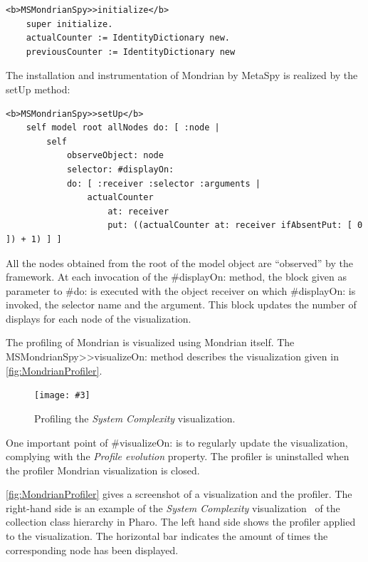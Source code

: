 \documentclass[runningheads]{llncs}
\newcommand{\project}{{\sc MetaSpy}\xspace}
\newcommand{\ct}{\lstinline[backgroundcolor=\color{white},basicstyle=\footnotesize\ttfamily]}
\newcommand{\ab}[1]{\nb{Alexandre}{blue}{#1}}
\newcommand{\lr}[1]{\nb{Lukas}{orange}{#1}}
\newcommand{\on}[1]{\nb{Oscar}{olive}{#1}}
\newcommand{\fig}[4]{
    \begin{figure}[#1]
        \centering
        \texttt{[image: \#3]}
        \caption{\label{fig:#3}#4}
    \end{figure}}
\newcommand{\co}[1]{{\sf #1}}
\begin{document}
\begin{lstlisting}
<b>MSMondrianSpy>>initialize</b>
    super initialize.
    actualCounter := IdentityDictionary new.
    previousCounter := IdentityDictionary new
\end{lstlisting}

The installation and instrumentation of Mondrian by \project is realized by the {\sf setUp} method:

\begin{lstlisting}
<b>MSMondrianSpy>>setUp</b>
    self model root allNodes do: [ :node |
        self 
            observeObject: node
            selector: #displayOn:
            do: [ :receiver :selector :arguments |
                actualCounter 
                    at: receiver
                    put: ((actualCounter at: receiver ifAbsentPut: [ 0 ]) + 1) ] ]
\end{lstlisting}

All the nodes obtained from the root of the model object are ``observed'' by the framework. At each invocation of the {\sf \#displayOn:} method, the block given as parameter to {\sf \#do:} is executed with the object receiver on which {\sf \#displayOn:} is invoked, the selector name and the argument. This block updates the number of displays for each node of the visualization.

The profiling of Mondrian is visualized using Mondrian itself. The \co{MSMondrianSpy>>visualizeOn:} \on{fix} method describes the visualization given in \autoref{fig:MondrianProfiler}.


\fig{}{.8}{MondrianProfiler}{Profiling the \emph{System Complexity} visualization.}

One important point of \co{\#visualizeOn:} is to regularly update the visualization, complying with the \emph{Profile evolution} property. The profiler is uninstalled when the profiler Mondrian visualization is closed.

\autoref{fig:MondrianProfiler} gives a screenshot of a visualization and the profiler. The right-hand side is an example of the \emph{System Complexity} visualization~\cite{Lanz03d} of the collection class hierarchy in Pharo. The left hand side shows the profiler applied to the visualization. The horizontal bar indicates the amount of times the corresponding node has been displayed. %
\end{document}
